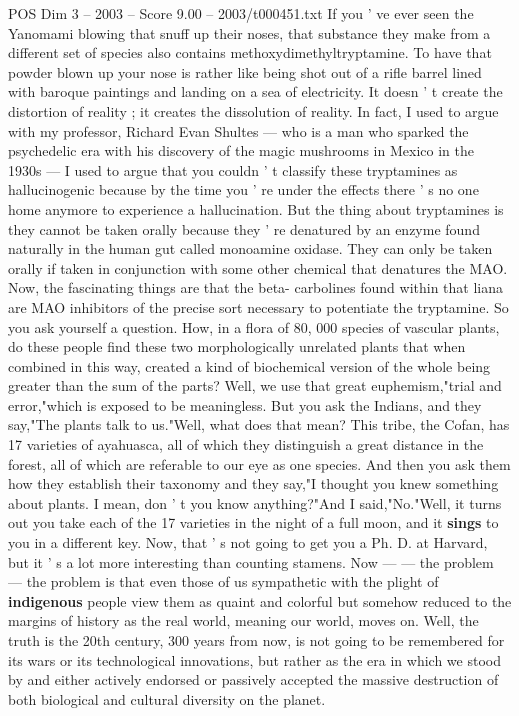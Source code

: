 \begin{textsample}{POS Dim 3 – 2003 – Score 9.00 – 2003/t000451.txt}
If you ' ve ever seen the Yanomami blowing that snuff up their noses, that substance they make from a different set of species also contains methoxydimethyltryptamine.
To have that powder blown up your nose is rather like being shot out of a rifle barrel lined with baroque paintings and landing on a sea of electricity.
It doesn ' t create the distortion of reality ; it creates the dissolution of reality.
In fact, I used to argue with my professor, Richard Evan Shultes — who is a man who sparked the psychedelic era with his discovery of the magic mushrooms in Mexico in the 1930s — I used to argue that you couldn ' t classify these tryptamines as hallucinogenic because by the time you ' re under the effects there ' s no one home anymore to experience a hallucination.
But the thing about tryptamines is they cannot be taken orally because they ' re denatured by an enzyme found naturally in the human gut called monoamine oxidase.
They can only be taken orally if taken in conjunction with some other chemical that denatures the MAO.
Now, the fascinating things are that the beta- carbolines found within that liana are MAO inhibitors of the precise sort necessary to potentiate the tryptamine.
So you ask yourself a question.
How, in a flora of 80, 000 species of vascular plants, do these people find these two morphologically unrelated plants that when combined in this way, created a kind of biochemical version of the whole being greater than the sum of the parts?
Well, we use that great euphemism,"trial and error,"which is exposed to be meaningless.
But you ask the Indians, and they say,"The plants talk to us."Well, what does that mean?
This tribe, the Cofan, has 17 varieties of ayahuasca, all of which they distinguish a great distance in the forest, all of which are referable to our eye as one species.
And then you ask them how they establish their taxonomy and they say,"I thought you knew something about plants.
I mean, don ' t you know anything?"And I said,"No."Well, it turns out you take each of the 17 varieties in the night of a full moon, and it \textbf{sings} to you in a different key.
Now, that ' s not going to get you a Ph.
D. at Harvard, but it ' s a lot more interesting than counting stamens.
Now — — the problem — the problem is that even those of us sympathetic with the plight of \textbf{indigenous} people view them as quaint and colorful but somehow reduced to the margins of history as the real world, meaning our world, moves on.
Well, the truth is the 20th century, 300 years from now, is not going to be remembered for its wars or its technological innovations, but rather as the era in which we stood by and either actively endorsed or passively accepted the massive destruction of both biological and cultural diversity on the planet.

\end{textsample}
